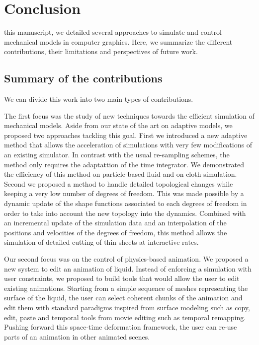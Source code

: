 \chapter[Conclusion]{Conclusion}
\label{chap:conclusion}

 this manuscript, we detailed several approaches to simulate and control mechanical models in computer graphics. 
Here, we summarize the different contributions, their limitations and perspectives of future work.

\section{Summary of the contributions}
We can divide this work into two main types of contributions.

The first focus was the study of new techniques towards the efficient simulation of mechanical models. 
Aside from our state of the art on adaptive models, we proposed two approaches tackling this goal.
First we introduced a new adaptive method that allows the acceleration of simulations with very few modifications of an existing simulator. 
In contrast with the usual re-sampling schemes, the method only requires the adaptattion of the time integrator. 
We demonstrated the efficiency of this method on particle-based fluid and on cloth simulation.
Second we proposed a method to handle detailed topological changes while keeping a very low number of degrees of freedom. 
This was made possible by a dynamic update of the shape functions associated to each degrees of freedom in order to take into account the new topology into the dynamics. 
Combined with an incremental update of the simulation data and an interpolation of the positions and velocities of the degrees of freedom, this method allows the simulation of detailed cutting of thin sheets at interactive rates.

Our second focus was on the control of physics-based animation. We proposed a new system to edit an animation of liquid. 
Instead of enforcing a simulation with user constraints, we proposed to build tools that would allow the user to edit existing animations.
Starting from a simple sequence of meshes representing the surface of the liquid, the user can select coherent chunks of the animation and edit them with standard paradigms inspired from surface modeling such as copy, edit, paste and temporal tools from movie editing such as temporal remapping. 
Pushing forward this space-time deformation framework, the user can re-use parts of an animation in other animated scenes.

